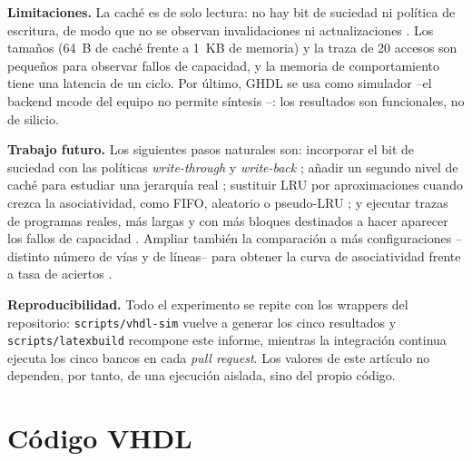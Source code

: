 \documentclass[llncs]{llncs}
\begin{document}
\textbf{Limitaciones.} La caché es de solo lectura: no hay bit de
suciedad ni política de escritura, de modo que no se observan
invalidaciones ni actualizaciones \cite{bryant2015,wikipedia-cache-computing}.
Los tamaños (64~B de caché frente a 1~KB de memoria) y la traza de
20 accesos son pequeños para observar fallos de capacidad, y la
memoria de comportamiento tiene una latencia de un ciclo. Por último,
GHDL se usa como simulador --el backend mcode del equipo no permite
síntesis \cite{ghdl-docs}--: los resultados son funcionales, no de
silicio.

\textbf{Trabajo futuro.} Los siguientes pasos naturales son: incorporar
el bit de suciedad con las políticas \emph{write-through} y
\emph{write-back} \cite{wikipedia-cache-computing,bryant2015,stallings2019};
añadir un segundo nivel de caché para estudiar una jerarquía real
\cite{tanenbaum2013}; sustituir LRU por aproximaciones cuando crezca la
asociatividad, como FIFO, aleatorio o pseudo-LRU \cite{hennessy2019};
y ejecutar trazas de programas reales, más largas y con más bloques
destinados a hacer aparecer los fallos de capacidad
\cite{patterson2017,bryant2015}. Ampliar también la comparación a más
configuraciones --distinto número de vías y de líneas-- para obtener la
curva de asociatividad frente a tasa de aciertos \cite{bryant2015}.

\textbf{Reproducibilidad.} Todo el experimento se repite con los
wrappers del repositorio: \texttt{scripts/\allowbreak vhdl-sim}
vuelve a generar los cinco resultados y
\texttt{scripts/\allowbreak latexbuild} recompone este informe, mientras
la integración continua ejecuta los cinco bancos en
cada \emph{pull request}. Los valores de este artículo no dependen,
por tanto, de una ejecución aislada, sino del propio código.




\appendix
\section{Código VHDL}
\label{app:codigo}
\end{document}

